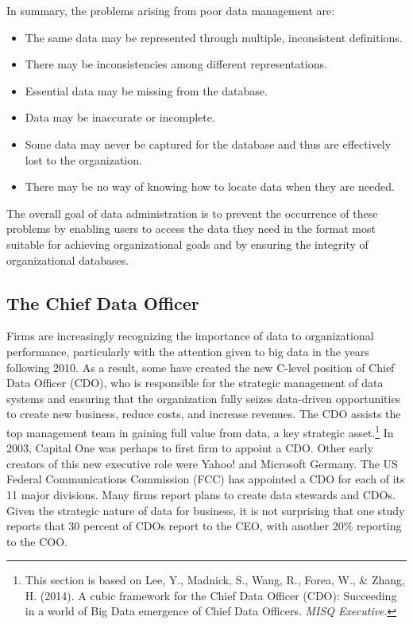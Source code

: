 \documentclass[
]{article}
\begin{document}
In summary, the problems arising from poor data management are:

\begin{itemize}
\item
  The same data may be represented through multiple, inconsistent
  definitions.
\item
  There may be inconsistencies among different representations.
\item
  Essential data may be missing from the database.
\item
  Data may be inaccurate or incomplete.
\item
  Some data may never be captured for the database and thus are
  effectively lost to the organization.
\item
  There may be no way of knowing how to locate data when they are
  needed.
\end{itemize}

The overall goal of data administration is to prevent the occurrence of
these problems by enabling users to access the data they need in the
format most suitable for achieving organizational goals and by ensuring
the integrity of organizational databases.

\hypertarget{the-chief-data-officer}{%
\subsection*{The Chief Data Officer}\label{the-chief-data-officer}}

Firms are increasingly recognizing the importance of data to
organizational performance, particularly with the attention given to big
data in the years following 2010. As a result, some have created the new
C-level position of Chief Data Officer (CDO), who is responsible for the
strategic management of data systems and ensuring that the organization
fully seizes data-driven opportunities to create new business, reduce
costs, and increase revenues. The CDO assists the top management team in
gaining full value from data, a key strategic asset.\footnote{This section is based on Lee, Y., Madnick, S., Wang, R., Forea,
  W., \& Zhang, H. (2014). A cubic framework for the Chief Data Officer
  (CDO): Succeeding in a world of Big Data emergence of Chief Data
  Officers. \emph{MISQ Executive}.} In 2003,
Capital One was perhaps to first firm to appoint a CDO. Other early
creators of this new executive role were Yahoo! and Microsoft Germany.
The US Federal Communications Commission (FCC) has appointed a CDO for
each of its 11 major divisions. Many firms report plans to create data
stewards and CDOs. Given the strategic nature of data for business, it
is not surprising that one study reports that 30 percent of CDOs report
to the CEO, with another 20\% reporting to the COO.
\end{document}
